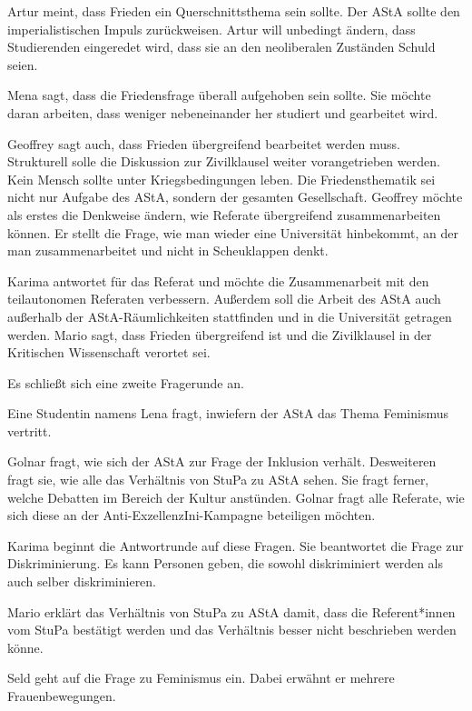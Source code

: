 \documentclass[ngerman,headheight=70pt]{scrartcl}
\begin{document}
    Artur meint, dass Frieden ein Querschnittsthema sein sollte. Der AStA sollte
    den imperialistischen Impuls zurückweisen. Artur will unbedingt ändern,
    dass Studierenden eingeredet wird, dass sie an den neoliberalen Zuständen
    Schuld seien.

    Mena sagt, dass die Friedensfrage überall aufgehoben sein sollte.
    Sie möchte daran arbeiten, dass weniger nebeneinander her studiert und
    gearbeitet wird.

    Geoffrey sagt auch, dass Frieden übergreifend bearbeitet werden muss.
    Strukturell solle die Diskussion zur Zivilklausel weiter vorangetrieben werden.
    Kein Mensch sollte unter Kriegsbedingungen leben. Die Friedensthematik
    sei nicht nur Aufgabe des AStA, sondern der gesamten Gesellschaft.
    Geoffrey möchte als erstes die Denkweise ändern, wie Referate übergreifend
    zusammenarbeiten können. Er stellt die Frage, wie man wieder eine Universität
    hinbekommt, an der man zusammenarbeitet und nicht in Scheuklappen denkt.

    Karima antwortet für das Referat und möchte die Zusammenarbeit mit den
    teilautonomen Referaten verbessern. Außerdem soll die Arbeit des AStA
    auch außerhalb der AStA-Räumlichkeiten stattfinden und in die Universität
    getragen werden. Mario sagt, dass Frieden übergreifend ist und die Zivilklausel
    in der Kritischen Wissenschaft verortet sei.

    Es schließt sich eine zweite Fragerunde an.

    Eine Studentin namens Lena fragt, inwiefern der AStA das Thema
    Feminismus vertritt.

    Golnar fragt, wie sich der AStA zur Frage der Inklusion verhält. Desweiteren
    fragt sie, wie alle das Verhältnis von StuPa zu AStA sehen. Sie fragt ferner,
    welche Debatten im Bereich der Kultur anstünden. Golnar fragt alle Referate,
    wie sich diese an der Anti-ExzellenzIni-Kampagne beteiligen möchten.

    Karima beginnt die Antwortrunde auf diese Fragen. Sie beantwortet die Frage
    zur Diskriminierung. Es kann Personen geben, die sowohl diskriminiert werden
    als auch selber diskriminieren.

    Mario erklärt das Verhältnis von StuPa zu AStA damit, dass die Referent*innen
    vom StuPa bestätigt werden und das Verhältnis besser nicht beschrieben werden
    könne.

    Seld geht auf die Frage zu Feminismus ein. Dabei erwähnt er mehrere
    Frauenbewegungen.
\end{document}
